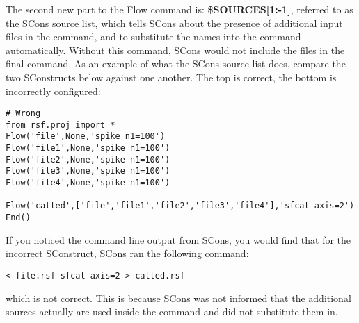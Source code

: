 The second new part to the Flow command is: \textbf{\${SOURCES[1:-1]}}, referred to as the SCons source list, which tells SCons about the presence of additional input files in the command, and to substitute the names into the command automatically.  Without this command, SCons would not include the files in the final command.  As an example of what the SCons source list does, compare the two SConstructs below against one another.  The top is correct, the bottom is incorrectly configured:
\begin{verbatim}
# Wrong
from rsf.proj import *
Flow('file',None,'spike n1=100')
Flow('file1',None,'spike n1=100')
Flow('file2',None,'spike n1=100')
Flow('file3',None,'spike n1=100')
Flow('file4',None,'spike n1=100')

Flow('catted',['file','file1','file2','file3','file4'],'sfcat axis=2')
End()
\end{verbatim}
If you noticed the command line output from SCons, you would find that for the incorrect SConstruct, SCons ran the following command:
\begin{verbatim}
< file.rsf sfcat axis=2 > catted.rsf
\end{verbatim}
which is not correct.  This is because SCons was not informed that the additional sources actually are used inside the command and did not substitute them in.  

